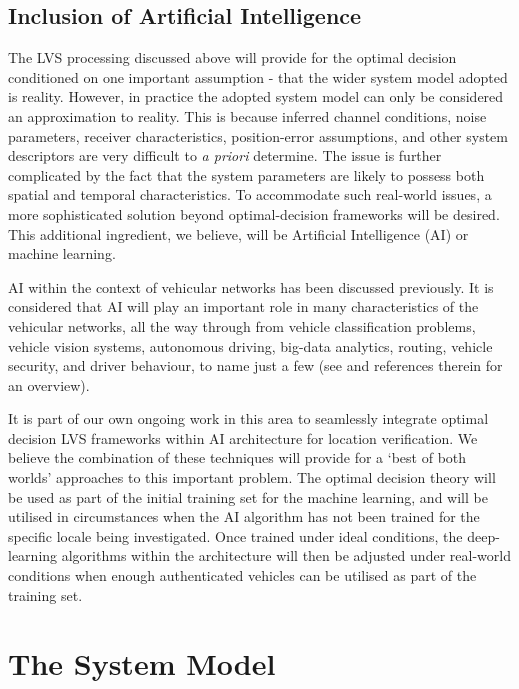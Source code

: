 \documentclass[journal]{IEEEtran}
\begin{document}
\subsection{Inclusion of Artificial Intelligence}
The LVS processing discussed above will provide for the optimal decision conditioned on one important assumption - that the wider system model adopted is reality. However, in practice the adopted system model can only be considered an approximation to reality. This is because inferred channel conditions, noise parameters, receiver characteristics, position-error assumptions, and other system descriptors are very difficult to \emph{a priori} determine. The issue is further complicated by the fact that the system parameters are likely to possess both spatial and temporal characteristics. To accommodate such real-world issues, a more sophisticated solution beyond optimal-decision frameworks will be desired. This additional ingredient, we believe, will be Artificial Intelligence (AI) or machine learning.

AI  within the context of vehicular networks has been discussed previously. It is considered that AI will play an important role in many characteristics of the vehicular networks, all the way through from vehicle classification problems, vehicle vision systems, autonomous driving, big-data analytics, routing, vehicle security, and driver behaviour, to name just a few (see \cite{fridman2017autonomous} and references therein for an overview).

It is part of our own ongoing work in this area to seamlessly integrate optimal decision LVS frameworks within AI architecture for location verification. We believe the combination of these techniques will provide for a `best of both worlds' approaches to this important problem. The optimal decision theory will be used as part of the initial training set for the machine learning, and will be utilised in circumstances when the AI algorithm has not been trained for the specific locale being investigated.  Once trained under ideal conditions, the deep-learning algorithms within the architecture will then be adjusted under real-world conditions when enough authenticated vehicles can be utilised as part of the training set.

\section{The System Model}\label{system_model}
\end{document}
